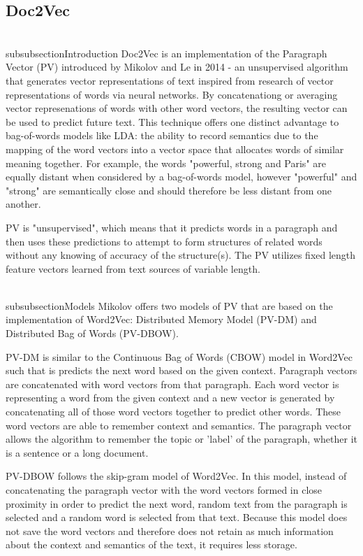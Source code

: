 \subsection{Doc2Vec}

\\subsubsection{Introduction}
Doc2Vec is an implementation of the Paragraph Vector (PV) introduced by Mikolov and Le in 2014 - an unsupervised algorithm that generates vector representations of text inspired from research of vector representations of words via neural networks. \cite{RefWorks:doc:5a6e5746e4b0d609eec798d7} By concatenationg or averaging vector represenations of words with other word vectors, the resulting vector can be used to predict future text. This technique offers one distinct advantage to bag-of-words models like LDA: the ability to record semantics due to the mapping of the word vectors into a vector space that allocates words of similar meaning together. For example, the words "powerful, strong and Paris" are equally distant when considered by a bag-of-words model, however "powerful" and "strong" are semantically close and should therefore be less distant from one another. \cite{RefWorks:doc:5a6e5746e4b0d609eec798d7}
	
PV is "unsupervised", which means that it predicts words in a paragraph and then uses these predictions to attempt to form structures of related words without any knowing of accuracy of the structure(s). The PV utilizes fixed length feature vectors learned from text sources of variable length. 


\\subsubsection{Models}
Mikolov offers two models of PV that are based on the implementation of Word2Vec: Distributed Memory Model (PV-DM) and Distributed Bag of Words (PV-DBOW). 

PV-DM is similar to the Continuous Bag of Words (CBOW) model in Word2Vec such that is predicts the next word based on the given context. Paragraph vectors are concatenated with word vectors from that paragraph.  Each word vector is representing a word from the given context and a new vector is generated by concatenating all of those word vectors together to predict other words. These word vectors are able to remember context and semantics. The paragraph vector allows the algorithm to remember the topic or 'label' of the paragraph, whether it is a sentence or a long document. 

PV-DBOW follows the skip-gram model of Word2Vec. In this model, instead of concatenating the paragraph vector with the word vectors formed in close proximity in order to predict the next word, random text from the paragraph is selected and a random word is selected from that text. Because this model does not save the word vectors and therefore does not retain as much information about the context and semantics of the text, it requires less storage.

